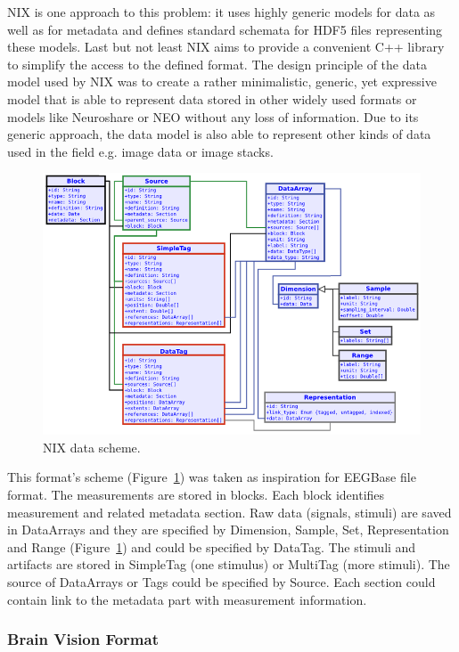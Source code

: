 \documentclass[conference]{IEEEtran}
\begin{document}
NIX is one approach to this problem: it uses highly generic models for data as well as for metadata and defines standard schemata for HDF5 files representing these models. Last but not least NIX aims to provide a convenient C++ library to simplify the access to the defined format. The design principle of the data model used by NIX was to create a rather minimalistic, generic, yet expressive model that is able to represent data stored in other widely used formats or models like Neuroshare or NEO without any loss of information. Due to its generic approach, the data model is also able to represent other kinds of data used in the field e.g. image data or image stacks. \cite{pandora}

\begin{figure}[h]
	\centering
	\includegraphics[scale=0.9]{obrazky/NIX_scheme.png}
	\caption{NIX data scheme. \cite{pandora}}
	\label{NIX_scheme}
\end{figure}



This format's scheme (Figure~\ref{NIX_scheme}) was taken as inspiration for EEGBase file format. The measurements are stored in blocks. Each block identifies measurement and related metadata section. Raw data (signals, stimuli) are saved in DataArrays and they are specified by Dimension, Sample, Set, Representation and Range (Figure~\ref{NIX_scheme}) and could be specified by DataTag. The stimuli and artifacts are stored in SimpleTag (one stimulus) or MultiTag (more stimuli). The source of DataArrays or Tags could be specified by Source. Each section could contain link to the metadata part with measurement information.

\subsubsection{Brain Vision Format}
\end{document}
